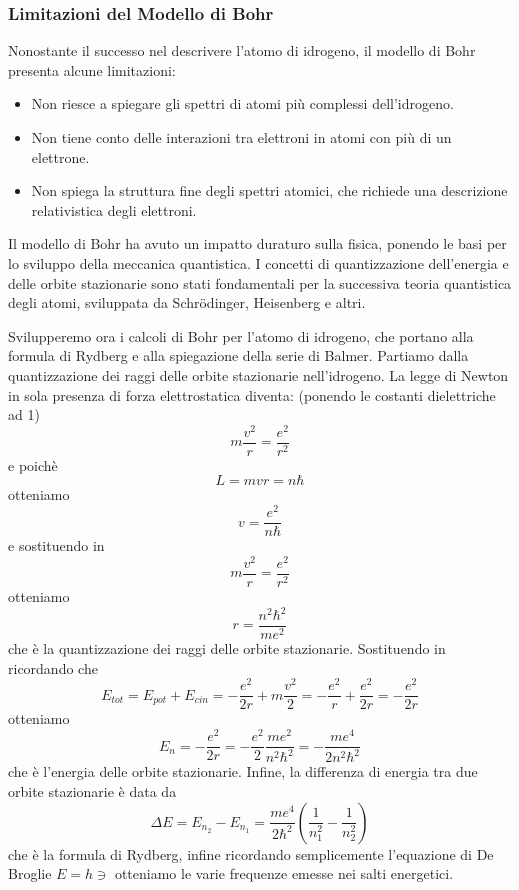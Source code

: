 \subsubsection*{Limitazioni del Modello di Bohr}
Nonostante il successo nel descrivere l'atomo di idrogeno, il modello di Bohr presenta alcune limitazioni:
\begin{itemize}
    \item Non riesce a spiegare gli spettri di atomi più complessi dell'idrogeno.
    \item Non tiene conto delle interazioni tra elettroni in atomi con più di un elettrone.
    \item Non spiega la struttura fine degli spettri atomici, che richiede una descrizione relativistica degli elettroni.
\end{itemize}
Il modello di Bohr ha avuto un impatto duraturo sulla fisica, ponendo le basi per lo sviluppo della meccanica quantistica. I concetti di quantizzazione dell'energia e delle orbite stazionarie sono stati fondamentali per la successiva teoria quantistica degli atomi, sviluppata da Schrödinger, Heisenberg e altri.

Svilupperemo ora i calcoli di Bohr per l'atomo di idrogeno, che portano alla formula di Rydberg e alla spiegazione della serie di Balmer. Partiamo dalla quantizzazione dei raggi delle orbite stazionarie nell'idrogeno. La legge di Newton in sola presenza di forza elettrostatica diventa: (ponendo le costanti dielettriche ad 1) 
$$m\frac{v^2}{r} = \frac{e^2}{r^2}$$e poichè $$L = mvr = n\hbar$$ otteniamo $$v = \frac{e^2}{n\hbar}$$ e sostituendo in $$m\frac{v^2}{r} = \frac{e^2}{r^2}$$ otteniamo $$r = \frac{n^2\hbar^2}{me^2}$$ che è la quantizzazione dei raggi delle orbite stazionarie. Sostituendo in ricordando che $$E_{tot}= E_{pot} + E_{cin} = -\frac{e^2}{2r} +  m \dfrac{v^2}{2} = -\frac{e^2}{r} + \frac{e^2}{2r} = -\frac{e^2}{2r}$$ otteniamo $$E_n = -\frac{e^2}{2r} = -\frac{e^2}{2} \frac{me^2}{n^2\hbar^2} = -\frac{me^4}{2n^2\hbar^2}$$ che è l'energia delle orbite stazionarie. Infine, la differenza di energia tra due orbite stazionarie è data da $$\Delta E = E_{n_2} - E_{n_1} = \frac{me^4}{2\hbar^2} \left( \frac{1}{n_1^2} - \frac{1}{n_2^2} \right)$$ che è la formula di Rydberg, infine ricordando semplicemente l'equazione di De Broglie $E = h \ni$ otteniamo le varie frequenze emesse nei salti energetici. 





